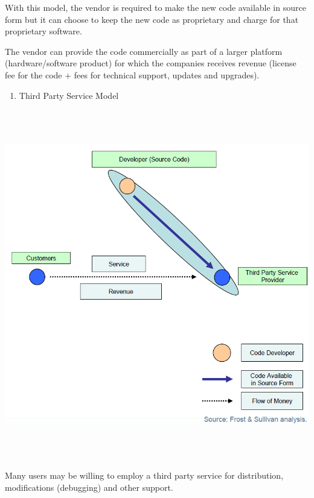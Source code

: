 With this model, the vendor is required to make the new code available
in source form but it can choose to keep the new code as proprietary
and charge for that proprietary software.

The vendor can provide the code commercially as part of a larger
platform (hardware/software product) for which the companies receives
revenue (license fee for the code + fees for technical support, updates
and upgrades).

\begin{enumerate}
\item Third Party Service Model
\end{enumerate}
 \includegraphics[width=16.595cm,height=15.304cm]{Impact-img2.png}

Many users may be willing to employ a third party service for
distribution, modifications (debugging) and other support.


